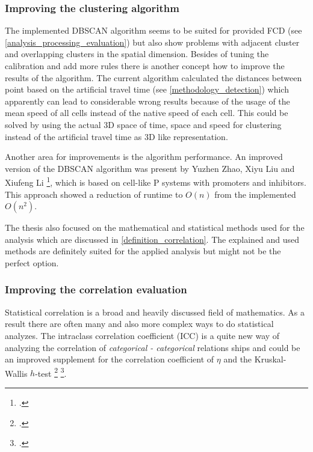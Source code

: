 \subsubsection{Improving the clustering algorithm}
The implemented DBSCAN algorithm seems to be suited for provided FCD (see \cref{analysis_processing_evaluation}) but also show problems with adjacent cluster and overlapping clusters in the spatial dimension. Besides of tuning the calibration and add more rules there is another concept how to improve the results of the algorithm. The current algorithm calculated the distances between point based on the artificial travel time (see \cref{methodology_detection}) which apparently can lead to considerable wrong results because of the usage of the mean speed of all cells instead of the native speed of each cell. This could be solved by using the actual 3D space of time, space and speed for clustering instead of the artificial travel time as 3D like representation.

Another area for improvements is the algorithm performance. An improved version of the DBSCAN algorithm was present by Yuzhen Zhao, Xiyu Liu and Xiufeng Li \footcite{https://journals.plos.org/plosone/article?id=10.1371/journal.pone.0200751}, which is based on cell-like P systems with promoters and inhibitors. This approach showed a reduction of runtime to $O(n)$ from the implemented $O(n^2)$.

\bigskip

The thesis also focused on the mathematical and statistical methods used for the analysis which are discussed in \cref{definition_correlation}. The explained and used methods are definitely suited for the applied analysis but might not be the perfect option.

\subsubsection{Improving the correlation evaluation}
Statistical correlation is a broad and heavily discussed field of mathematics. As a result there are often many and also more complex ways to do statistical analyzes. The intraclass correlation coefficient (ICC) is a quite new way of analyzing the correlation of \textit{categorical - categorical} relations ships and could be an improved supplement for the correlation coefficient of $\eta$ and the Kruskal-Wallis $h$-test \footcite{https://stats.stackexchange.com/questions/73065} \footcite{https://pingouin-stats.org/generated/pingouin.intraclass_corr.html}.

